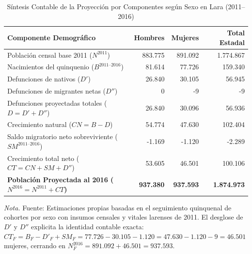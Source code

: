\documentclass[12pt,letterpaper]{article}
\begin{document}
\begin{table}[htbp]
    \centering
    \caption{Síntesis Contable de la Proyección por Componentes según Sexo en Lara (2011--2016)}
    \label{tab:sintesis_sexo}
    \small
    \setlength{\tabcolsep}{5pt}
    \renewcommand{\arraystretch}{1.2}
    \begin{tabularx}{\textwidth}{>{\raggedright\arraybackslash}Xrrr}
        \toprule
        \textbf{Componente Demográfico} & \textbf{Hombres} & \textbf{Mujeres} & \textbf{Total Estadal} \\
        \midrule
        Población censal base 2011 ($N^{2011}$) & 883.775 & 891.092 & 1.774.867 \\
        Nacimientos del quinquenio ($B^{2011\text{--}2016}$) & 81.614 & 77.726 & 159.340 \\
        Defunciones de nativos ($D'$) & 26.840 & 30.105 & 56.945 \\
        Defunciones de migrantes netas ($D''$) & 0 & -9 & -9 \\
        Defunciones proyectadas totales ($D = D' + D''$) & 26.840 & 30.096 & 56.936 \\
        Crecimiento natural ($CN = B - D$) & 54.774 & 47.630 & 102.404 \\
        Saldo migratorio neto sobreviviente ($SM^{2011\text{--}2016}$) & -1.169 & -1.120 & -2.289 \\
        Crecimiento total neto ($CT = CN + SM + D''$) & 53.605 & 46.501 & 100.106 \\
        \midrule
        \textbf{Población Proyectada al 2016 ($N^{2016} = N^{2011} + CT$)} & \textbf{937.380} & \textbf{937.593} & \textbf{1.874.973} \\
        \bottomrule
    \end{tabularx}
    \par\vspace{2pt}\noindent\raggedright \scriptsize \textit{Nota.} Fuente: Estimaciones propias basadas en el seguimiento quinquenal de cohortes por sexo con insumos censales y vitales larenses de 2011. El desglose de $D'$ y $D''$ explicita la identidad contable exacta: $CT_F = B_F - D'_F + SM_F = 77.726 - 30.105 - 1.120 = 47.630 - 1.120 - 9 = 46.501$ mujeres, cerrando en $N_F^{2016} = 891.092 + 46.501 = 937.593$.
\end{table}
\end{document}
